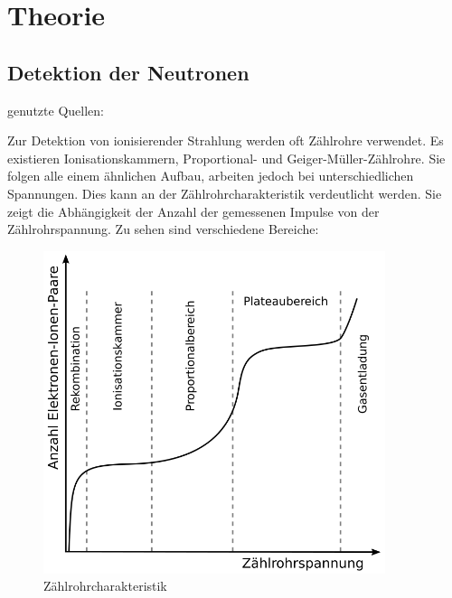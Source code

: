 \section{Theorie}

\subsection{Detektion der Neutronen}

genutzte Quellen: \cite{PRuD,He3_vacutec}

Zur Detektion von ionisierender Strahlung werden oft Zählrohre verwendet. Es existieren Ionisationskammern,  Proportional-  und Geiger-Müller-Zählrohre. Sie folgen alle einem ähnlichen Aufbau, arbeiten jedoch bei unterschiedlichen Spannungen.  Dies kann an der Zählrohrcharakteristik verdeutlicht werden. Sie zeigt die Abhängigkeit der Anzahl der gemessenen Impulse von der  Zählrohrspannung. Zu sehen sind verschiedene Bereiche:


\begin{figure}
	\includegraphics [width=10cm] {pics/Kennlinie_Zaehlrohr.png}
	\caption {Zählrohrcharakteristik\protect\footnotemark }
\end{figure}


